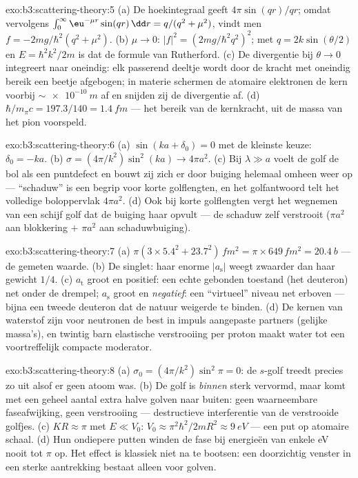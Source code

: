 \begin{solution}{exo:b3:scattering-theory:5}
(a) De hoekintegraal geeft $4\pi\sin(qr)/qr$; omdat vervolgens
$\int_0^\infty\eu^{-\mu r}\sin(qr)\,\dd r = q/(q^2 + \mu^2)$, vindt men $f = -2mg/\hbar^2(q^2 + \mu^2)$. (b) $\mu \to 0$: $|f|^2 =
(2mg/\hbar^2q^2)^2$; met $q = 2k\sin(\theta/2)$ en $E =
\hbar^2k^2/2m$ is
dat de formule van Rutherford. (c) De divergentie bij $\theta \to
0$
integreert naar oneindig: elk passerend deeltje wordt door de kracht met
oneindig bereik een beetje afgebogen; in materie schermen de atomaire
elektronen de kern voorbij $\sim\qty{e-10}{m}$ af en snijden zij de
divergentie af. (d) $\hbar/m_\pi c = 197.3/140 = \qty{1.4}{fm}$ --- het
bereik van de kernkracht, uit de massa van het pion voorspeld.
\end{solution}

\begin{solution}{exo:b3:scattering-theory:6}
(a) $\sin(ka + \delta_0) = 0$ met de kleinste keuze: $\delta_0
= -ka$. (b)
$\sigma = (4\pi/k^2)\sin^2(ka) \to 4\pi a^2$. (c) Bij $\lambda \gg a$
voelt de golf de bol als een puntdefect en bouwt zij zich er door buiging
helemaal omheen weer op --- ``schaduw'' is een begrip voor korte
golflengten, en het golfantwoord telt het volledige boloppervlak $4\pi a^2$. (d) Ook bij korte golflengten vergt het wegnemen van een schijf golf
dat de buiging haar opvult --- de schaduw zelf verstrooit ($\pi a^2$ aan
blokkering $+$ $\pi a^2$ aan schaduwbuiging).
\end{solution}

\begin{solution}{exo:b3:scattering-theory:7}
(a) $\pi(3 \times 5.4^2 + 23.7^2)\,\unit{fm^2} = \pi \times 649
\,\unit{fm^2} = \qty{20.4}{b}$ --- de gemeten waarde. (b) De singlet: haar
enorme $|a_{\text{s}}|$ weegt zwaarder dan haar gewicht $1/4$. (c)
$a_{\text{t}}$ groot en positief: een echte gebonden toestand (het
deuteron) net onder de drempel; $a_{\text{s}}$ groot en \emph{negatief}:
een ``virtueel'' niveau net erboven --- bijna een tweede deuteron dat de
natuur weigerde te binden. (d) De kernen van waterstof zijn voor neutronen
de best in impuls aangepaste partners (gelijke massa's), en twintig barn
elastische verstrooiing per proton maakt water tot een voortreffelijk
compacte moderator.
\end{solution}

\begin{solution}{exo:b3:scattering-theory:8}
(a) $\sigma_0 = (4\pi/k^2)\sin^2\pi = 0$: de $s$-golf treedt precies zo
uit alsof er geen atoom was. (b) De golf is \emph{binnen} sterk vervormd,
maar komt met een geheel aantal extra halve golven naar buiten: geen
waarneembare faseafwijking, geen verstrooiing --- destructieve
interferentie van de verstrooide golfjes. (c) $KR
\approx \pi$ met $E \ll V_0$: $V_0 \approx \pi^2\hbar^2/2mR^2
\approx \qty{9}{eV}$ --- een put op
atomaire schaal. (d) Hun ondiepere putten winden de fase bij energieën van
enkele eV nooit tot $\pi$ op. Het effect is klassiek niet na te bootsen:
een doorzichtig venster in een sterke aantrekking bestaat alleen voor
golven.
\end{solution}

